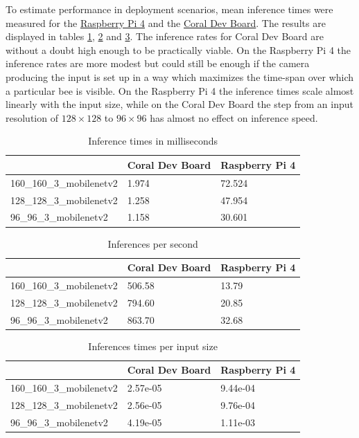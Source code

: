 \documentclass[12pt,a4paper]{article}
\begin{document}
To estimate performance in deployment scenarios, mean inference times were measured for the \href{https://www.raspberrypi.org/products/raspberry-pi-4-model-b/specifications/}{Raspberry Pi 4} and  the \href{https://coral.ai/products/dev-board/#tech-specs}{Coral Dev Board}. The results are displayed in tables \ref{table:inference_times}, \ref{table:inference_rates} and \ref{table:inference_times_per_input_size}. The inference rates for Coral Dev Board are without a doubt high enough to be practically viable. On the Raspberry Pi 4 the inference rates are more modest but could still be enough if the camera producing the input is set up in a way which maximizes the time-span over which a particular bee is visible. On the Raspberry Pi 4 the inference times scale almost linearly with the input size, while on the Coral Dev Board the step from an input resolution of $128 \times 128$ to $96 \times 96$ has almost no effect on inference speed.

\begin{table}[H]
\centering
\begin{tabular}{@{}lll@{}}
\toprule
                         & Coral Dev Board    & Raspberry Pi 4     \\ \midrule
160\_160\_3\_mobilenetv2 & 1.974 & 72.524  \\
128\_128\_3\_mobilenetv2 & 1.258 & 47.954  \\
96\_96\_3\_mobilenetv2   & 1.158  & 30.601 \\ \bottomrule
\end{tabular}
\caption{Inference times in milliseconds}
\label{table:inference_times}
\end{table}

\begin{table}[H]
\centering
\begin{tabular}{@{}lll@{}}
\toprule
                         & Coral Dev Board   & Raspberry Pi 4     \\  \midrule
160\_160\_3\_mobilenetv2 & 506.58  & 13.79 \\
128\_128\_3\_mobilenetv2 & 794.60 & 20.85  \\
96\_96\_3\_mobilenetv2   & 863.70 & 32.68 \\ \bottomrule
\end{tabular}
\caption{Inferences per second}
\label{table:inference_rates}
\end{table}

\begin{table}[H]
\centering
\begin{tabular}{@{}lll@{}}
\toprule
                         & Coral Dev Board        & Raspberry Pi 4        \\ \midrule
160\_160\_3\_mobilenetv2 & 2.57e-05 & 9.44e-04 \\
128\_128\_3\_mobilenetv2 & 2.56e-05  & 9.76e-04 \\
96\_96\_3\_mobilenetv2   & 4.19e-05   & 1.11e-03  \\ \bottomrule
\end{tabular}
\caption{Inferences times per input size}
\label{table:inference_times_per_input_size}
\end{table}
\end{document}
